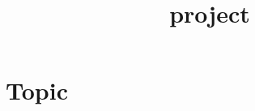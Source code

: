 \documentclass[pgfoptions=pdf]{article}
\begin{document}
\title{project}


\section{Topic}
\end{document}
